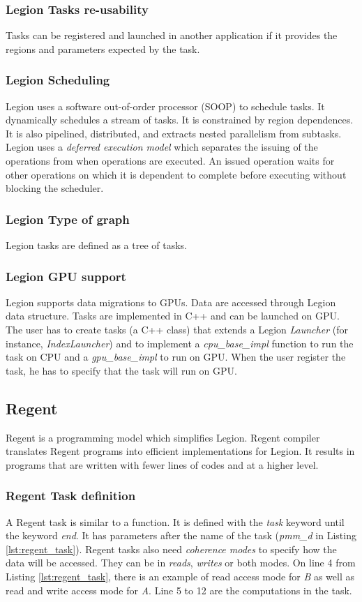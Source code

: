 \subsubsection{Legion Tasks re-usability}
Tasks can be registered and launched in another application if it provides the regions and parameters expected by the task.

\subsubsection{Legion Scheduling}
Legion uses a software out-of-order processor (SOOP) to schedule tasks.
It dynamically schedules a stream of tasks.
It is constrained by region dependences.
It is also pipelined, distributed, and extracts nested parallelism from subtasks.
Legion uses a \textit{deferred execution model} which separates the issuing of the operations from when operations are executed.
An issued operation waits for other operations on which it is dependent to complete before executing without blocking the scheduler.

\subsubsection{Legion Type of graph}
Legion tasks are defined as a tree of tasks.

\subsubsection{Legion GPU support}
Legion supports data migrations to GPUs.
Data are accessed through Legion data structure.
Tasks are implemented in C++ and can be launched on GPU.
The user has to create tasks (a C++ class) that extends a Legion \textit{Launcher} (for instance, \textit{IndexLauncher}) and to implement a \textit{cpu\_base\_impl} function to run the task on CPU and a \textit{gpu\_base\_impl} to run on GPU.
When the user register the task, he has to specify that the task will run on GPU.

\subsection{Regent}
Regent \cite{SLTBA2015} is a programming model which simplifies Legion.
Regent compiler translates Regent programs into efficient implementations for Legion.
It results in programs that are written with fewer lines of codes and at a higher level.

\subsubsection{Regent Task definition}
A Regent task is similar to a function.
It is defined with the \textit{task} keyword until the keyword \textit{end}.
It has parameters after the name of the task (\textit{pmm\_d} in Listing \ref{lst:regent_task}).
Regent tasks also need \textit{coherence modes} to specify how the data will be accessed.
They can be in \textit{reads}, \textit{writes} or both modes.
On line 4 from Listing \ref{lst:regent_task}, there is an example of read access mode for \textit{B} as well as read and write access mode for \textit{A}.
Line 5 to 12 are the computations in the task.


